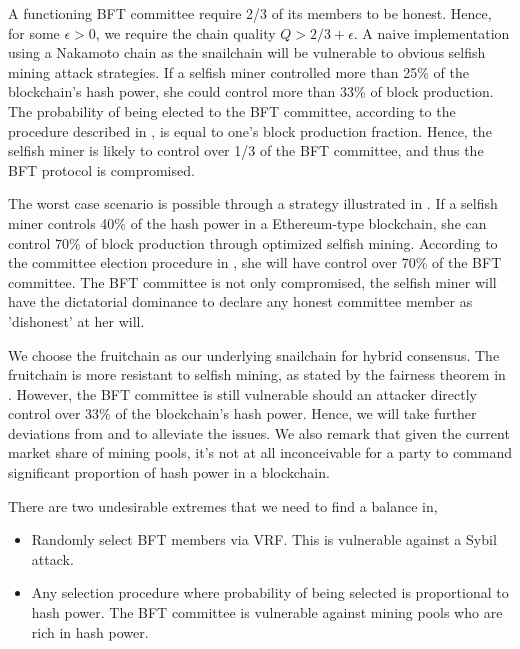 \documentclass[9pt,oneside]{amsart}
\begin{document}
\begin{multicols}{2}
A functioning BFT committee require 2/3 of its members to be honest\cite{castro1999practical}. Hence, for some $\epsilon > 0$, we require the chain quality $Q > 2/3 + \epsilon$. A naive implementation using a Nakamoto chain as the snailchain will be vulnerable to obvious selfish mining attack strategies. If a selfish miner controlled more than 25\% of the blockchain's hash power, she could control more than 33\% of block production\cite{naya2015stub}\cite{eyal2013self}. The probability of being elected to the BFT committee, according to the procedure described in \cite{pass2017hybrid}, is equal to one's block production fraction. Hence, the selfish miner is likely to control over 1/3 of the BFT committee, and thus the BFT protocol is compromised. 

The worst case scenario is possible through a strategy illustrated in \cite{ritz2018uncle}. If a selfish miner controls 40\% of the hash power in a Ethereum-type blockchain, she can control 70\% of block production through optimized selfish mining. According to the committee election procedure in \cite{pass2017hybrid}, she will have control over 70\% of the BFT committee. The BFT committee is not only compromised, the selfish miner will have the dictatorial dominance to declare any honest committee member as 'dishonest' at her will. 

We choose the fruitchain\cite{pass2017fruit} as our underlying snailchain for hybrid consensus. The fruitchain is more resistant to selfish mining, as stated by the fairness theorem in \cite{pass2017fruit}. However, the BFT committee is still vulnerable should an attacker directly control over 33\% of the blockchain's hash power. Hence, we will take further deviations from \cite{pass2017hybrid} and \cite{pass2017fruit} to alleviate the issues. We also remark that given the current market share of mining pools, it's not at all inconceivable for a party to command significant proportion of hash power in a blockchain. 

There are two undesirable extremes that we need to find a balance in, 
\begin{itemize}
	\item Randomly select BFT members via VRF\cite{micali1999verifiable}. This is vulnerable against a Sybil attack.
	\newline
	\item Any selection procedure where probability of being selected is proportional to hash power. The BFT committee is vulnerable against mining pools who are rich in hash power. 
\end{itemize} 



\end{multicols}
\end{document}
